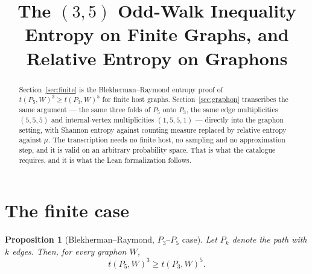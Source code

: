 \documentclass[11pt]{article}
\title{The $(3,5)$ Odd-Walk Inequality\\
Entropy on Finite Graphs, and Relative Entropy on Graphons}
\author{}
\date{}
\newtheorem{proposition}[theorem]{Proposition}
\begin{document}
\maketitle

\begin{abstract}
Section~\ref{sec:finite} is the Blekherman--Raymond entropy proof of
$t(P_5,W)^3\geq t(P_3,W)^5$ for finite host graphs.  Section~\ref{sec:graphon}
transcribes the same argument --- the same three folds of $P_5$ onto $P_3$, the
same edge multiplicities $(5,5,5)$ and internal-vertex multiplicities
$(1,5,5,1)$ --- directly into the graphon setting, with Shannon entropy against
counting measure replaced by relative entropy against $\mu$.  The transcription
needs no finite host, no sampling and no approximation step, and it is valid on
an arbitrary probability space.  That is what the catalogue requires, and it is
what the Lean formalization follows.
\end{abstract}

\section{The finite case}
\label{sec:finite}

\begin{proposition}[Blekherman--Raymond, $P_3$--$P_5$ case]
Let $P_k$ denote the path with $k$ edges. Then, for every graphon $W$,
\[
    t(P_5,W)^3 \ge t(P_3,W)^5.
\]
\end{proposition}
\end{document}
